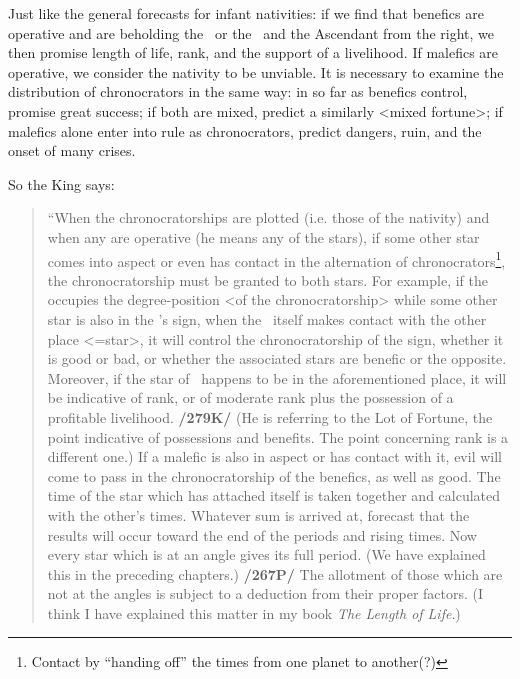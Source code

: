 Just  like the general forecasts for infant nativities: if we find that benefics are operative and are beholding the \Sun\, or the \Moon\, and the Ascendant from the right, we then promise length of life, rank, and the support of a livelihood. If malefics are operative, we consider the nativity to be unviable. It is necessary to examine the distribution of
chronocrators in the same way: in so far as benefics control, promise great success; if both are mixed, predict a similarly <mixed fortune>; if malefics alone enter into rule as chronocrators, predict dangers, ruin, and the onset of many crises.

So the King says:
\begin{quote}
“When the chronocratorships are plotted (i.e. those of the nativity) and when any are operative (he means any of the stars), if some other star comes into aspect or even has contact in the alternation of
chronocrators\footnote{Contact by ``handing off'' the times from one planet to another(?)}, the chronocratorship must be granted to both stars. For example, if the \Moon\, occupies the degree-position <of the chronocratorship> while some other star is also in the \Moon’s
sign, when the \Moon\, itself makes contact with the other place <=star>, it will control the chronocratorship of the sign, whether it is good or bad, or whether the associated stars are benefic or
the opposite. Moreover, if the star of \Jupiter\, happens to be in the aforementioned place, it will be indicative of rank, or of moderate rank plus the possession of a profitable livelihood. \textbf{/279K/} (He is
referring to the Lot of Fortune, the point indicative of possessions and benefits. The point concerning rank is a different one.) If a malefic is also in aspect or has contact with it, evil will come to pass in the chronocratorship of the benefics, as well as good. The time of the star which has attached itself is taken together and calculated with the other’s times. Whatever sum is arrived at, forecast that the results will occur toward the end of the periods and rising times. Now every star
which is at an angle gives its full period. (We have explained this in the preceding chapters.) \textbf{/267P/} The allotment of those which are not at the angles is subject to a deduction from their proper factors. (I think I have explained this matter in my book \textit{The Length of Life}.)


\end{quote}
